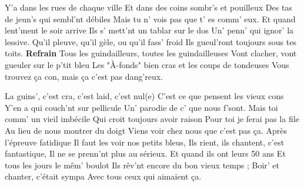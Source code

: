 \footnotemark[
ititle={Ad Memorandum Guindae},
tu={Les Acadiens (P. : Maurice Vidalin - M. : Michel Fugain)}]
\beginverse
Y'a dans les rues de chaque ville
Et dans des coins sombr's et pouilleux
Des tas de jeun's qui sembl'nt débiles
Mais tu n' vois pas que t' es comm' eux.
Et quand lent'ment le soir arrive
Ils s' mett'nt un tablar sur le dos
Un' penn' qui ignor' la lessive.
Qu'il pleuve, qu'il gèle, ou qu'il fass' froid
Ils gueul'ront toujours sous tes toits.
\endverse
\beginchorus
\textbf{Refrain}
Tous les guindailleurs, toutes les guindailleuses
Vont clacher, vont gueuler sur le p'tit bleu
Les "À-fonds" bien cras et les coups de tondeuses
Vous trouvez ça con, mais ça c'est pas dang'reux.
\endchorus

\beginverse
La guins', c'est cra, c'est laid, c'est nul(e)
C'est ce que pensent les vieux cons
Y'en a qui couch'nt sur pellicule
Un' parodie de c' que nous f'sont.
Mais toi comm' un vieil imbécile
Qui croit toujours avoir raison
Pour toi je ferai pas la file
Au lieu de nous montrer du doigt
Viens voir chez nous que c'est pas ça.
\endverse
\beginverse
Après l'épreuve fatidique
Il faut les voir nos petits bleus,
Ils rient, ils chantent, c'est fantastique,
Il ne se prenn'nt plus au sérieux.
Et quand ils ont leurs 50 ans
Et tous les jours le mêm' boulot
Ils rêv'nt encore du bon vieux temps ;
Boir' et chanter, c'était sympa
Avec tous ceux qui aimaient ça.
\endverse
\endsong


